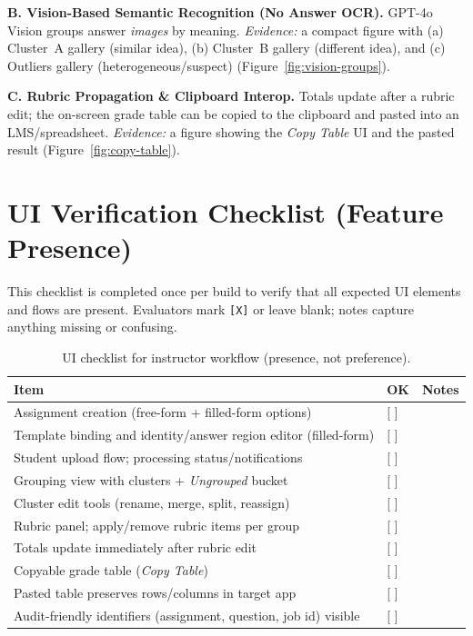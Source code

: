 \documentclass[ms,twoside,print]{nuthesis}
\begin{document}
\textbf{B. Vision-Based Semantic Recognition (No Answer OCR).}
GPT-4o Vision groups answer \emph{images} by meaning.  
\emph{Evidence:} a compact figure with (a) Cluster~A gallery (similar idea), (b) Cluster~B gallery (different idea), and (c) Outliers gallery (heterogeneous/suspect) (Figure~\ref{fig:vision-groups}).

\textbf{C. Rubric Propagation \& Clipboard Interop.}
Totals update after a rubric edit; the on-screen grade table can be copied to the clipboard and pasted into an LMS/spreadsheet.  
\emph{Evidence:} a figure showing the \emph{Copy Table} UI and the pasted result (Figure~\ref{fig:copy-table}).

\section{UI Verification Checklist (Feature Presence)}
This checklist is completed once per build to verify that all expected UI elements and flows are present. Evaluators mark \texttt{[X]} or leave blank; notes capture anything missing or confusing.

\begin{table}[H]\centering
\caption{UI checklist for instructor workflow (presence, not preference).}\label{tab:ui-checklist}
\begin{tabularx}{\textwidth}{@{}p{6.7cm}p{1.2cm}X@{}}
\toprule
\textbf{Item} & \textbf{OK} & \textbf{Notes} \\
\midrule
Assignment creation (free-form + filled-form options) & [ ] &  \\
Template binding and identity/answer region editor (filled-form) & [ ] &  \\
Student upload flow; processing status/notifications & [ ] &  \\
Grouping view with clusters + \emph{Ungrouped} bucket & [ ] &  \\
Cluster edit tools (rename, merge, split, reassign) & [ ] &  \\
Rubric panel; apply/remove rubric items per group & [ ] &  \\
Totals update immediately after rubric edit & [ ] &  \\
Copyable grade table (\emph{Copy Table}) & [ ] &  \\
Pasted table preserves rows/columns in target app & [ ] &  \\
Audit-friendly identifiers (assignment, question, job id) visible & [ ] &  \\
\bottomrule
\end{tabularx}
\end{table}
\end{document}
